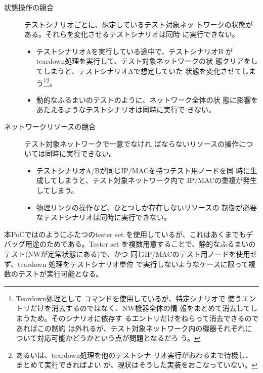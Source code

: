 \begin{description}
 \item[状態操作の競合] テストシナリオごとに、想定しているテスト対象ネッ
            トワークの状態がある。それらを変化させるテストシナリオは同時
            に実行できない。
            \begin{itemize}
             \item テストシナリオAを実行している途中で、テストシナリオB
                   がteardown処理を実行して、テスト対象ネットワークの状
                   態クリアをしてしまうと、テストシナリオAで想定していた
                   状態を変化させてしまう\footnote{Teardown処理として
                   コマンドを使用しているが、特定シナリオで
                   使うエントリだけを消去するのではなく、NW機器全体の情
                   報をまとめて消去してしまうため。そのシナリオに依存す
                   るエントリだけをねらって消去できるのであればこの制約
                   は外れるが、テスト対象ネットワーク内の機器それぞれに
                   ついて対応可能かどうかという点が問題となるだろ
                   う。}\footnote{あるいは、teardown処理を他のテストシナ
                   リオ実行がおわるまで待機し、まとめて実行できればよい
                   が、現状はそうした実装をおこなっていない。}。
             \item 動的なふるまいのテストのように、ネットワーク全体の状
                   態に影響をあたえるようなテストシナリオは同時に実行で
                   きない。
            \end{itemize}
 \item[ネットワークリソースの競合] テスト対象ネットワークで一意でなけれ
            ばならないリソースの操作については同時に実行できない。
            \begin{itemize}
             \item テストシナリオA/Bが同じIP/MACを持つテスト用ノードを同
                   時に生成してしまうと、テスト対象ネットワーク内で
                   IP/MACの重複が発生してしまう。
             \item 物理リンクの操作など、ひとつしか存在しないリソースの
                   制御が必要なテストシナリオは同時に実行できない。
            \end{itemize}
\end{description}

本PoCではのようにふたつのtester set
を使用しているが、これはあくまでもデバッグ用途のためである。Tester set
を複数用意することで、静的なふるまいのテスト(NWが定常状態にある)で、かつ
同じIP/MACのテスト用ノードを使用せず、teardown 処理をテストシナリオ単位
で実行しないようなケースに限って複数のテストが実行可能となる。

